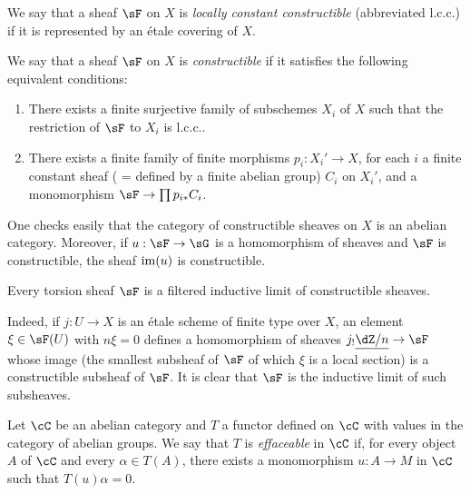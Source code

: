 \begin{definition}\label{I:4-3-1}
We say that a sheaf $\sF$ on $X$ is \emph{locally constant constructible}
(abbreviated l.c.c.) if it is represented by an \'etale covering of
$X$.
\end{definition}





\begin{definition}\label{I:4-3-2}
We say that a sheaf $\sF$ on $X$ is \emph{constructible} if it satisfies the
following equivalent conditions:
\begin{enumerate}[\indent (i)]
  \item There exists a finite surjective family of subschemes $X_i$ of $X$
     such that the restriction of $\sF$ to $X_i$ is l.c.c..
  \item There exists a finite family of finite morphisms $p_i:X_i'\to X$, for
    each $i$ a finite constant sheaf ( = defined by a finite
    abelian group) $C_i$ on $X_i'$, and a monomorphism
    $\sF\to \prod p_{i*} C_i$.
\end{enumerate}
\end{definition}

One checks easily that the category of constructible sheaves on $X$
is an abelian category. Moreover, if $u:\sF\to \sG$ is a homomorphism of
sheaves and $\sF$ is constructible, the sheaf $\operatorname{im}(u)$ is constructible.





\begin{lemma}\label{I:4-3-3}
Every torsion sheaf $\sF$ is a filtered inductive limit of constructible
sheaves.
\end{lemma}

Indeed, if $j:U\to X$ is an \'etale scheme of finite type over $X$, an
element $\xi\in \sF(U)$ with $n\xi=0$ defines a homomorphism of
sheaves $j_! \const{\dZ/n}\to \sF$ whose image (the smallest subsheaf of
$\sF$ of which $\xi$ is a local section) is a constructible subsheaf of $\sF$.
It is clear that $\sF$ is the inductive limit of such subsheaves.





\begin{definition}\label{I:4-3-4}
Let $\cC$ be an abelian category and $T$ a functor defined on $\cC$
with values in the category of abelian groups. We say that $T$ is
\emph{effaceable} in $\cC$ if, for every object $A$ of $\cC$ and every
$\alpha\in T(A)$, there exists a monomorphism $u:A\to M$ in $\cC$ such that
$T(u)\alpha = 0$.
\end{definition}





